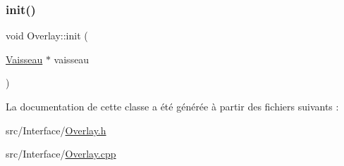 \mbox{\label{class_overlay_afce384f88db42331c819e361a90d943d}} 
\subsubsection{\texorpdfstring{init()}{init()}}
{\footnotesize\ttfamily void Overlay\+::init (\begin{DoxyParamCaption}\item[{\hyperlink{class_vaisseau}{Vaisseau} $\ast$}]{vaisseau }\end{DoxyParamCaption})}



La documentation de cette classe a été générée à partir des fichiers suivants \+:\begin{DoxyCompactItemize}
\item 
src/\+Interface/\hyperlink{_overlay_8h}{Overlay.\+h}\item 
src/\+Interface/\hyperlink{_overlay_8cpp}{Overlay.\+cpp}\end{DoxyCompactItemize}
